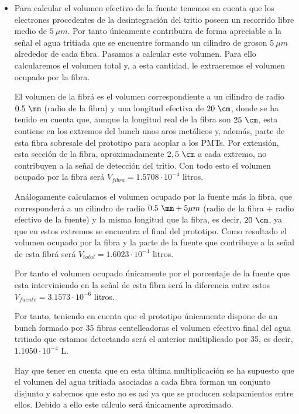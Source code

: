 \begin{itemize}
 \item{} Para calcular el volumen efectivo de la fuente tenemos en cuenta que los electrones procedentes de la desintegración del tritio poseen un recorrido libre medio de $5~\mu m$. Por tanto únicamente contribuira de forma apreciable a la señal el agua tritiada que se encuentre formando un cilindro de groson $5~\mu m$ alrededor de cada fibra. Pasamos a calcular este volumen. Para ello calcularemos el volumen total y, a esta cantidad, le extraeremos el volumen ocupado por la fibra.

El volumen de la fibrá es el volumen correspondiente a un cilindro de radio $0.5~\mm$ (radio de la fibra) y una longitud efectiva de $20~\cm$, donde se ha tenido en cuenta que, aunque la longitud real de la fibra son $25~\cm$, esta contiene en los extremos del bunch unos aros metálicos y, además, parte de esta fibra sobresale del prototipo para acoplar a los PMTs. Por extensión, esta sección de la fibra, aproximadamente $2,5~\cm$ a cada extremo,  no contribuyen a la señal de detección del tritio. Con todo esto el volumen ocupado por la fibra será $V_{fibra}=1.5708 \cdotp 10^{-4}$ litros.

Análogamente calculamos el volumen ocupado por la fuente más la fibra, que corresponderá a un cilindro de radio $0.5~\mm+5\mu m$ (radio de la fibra + radio efectivo de la fuente) y la misma longitud que la fibra, es decir, $20~\cm$, ya que en estos extremos se encuentra el final del prototipo. Como resultado el volumen ocupado por la fibra y la parte de la fuente que contribuye a la señal de esta fibrá será $V_{total}=1.6023 \cdotp 10^{-4}$ litros. 

Por tanto el volumen ocupado únicamente por el porcentaje de la fuente que esta interviniendo en la señal de esta fibra será la diferencia entre estos $V_{fuente}=3.1573 \cdotp 10^{-6}$ litros.
 
Por tanto, teniendo en cuenta que el prototipo únicamente dispone de un bunch formado por 35 fibras centelleadoras el volumen efectivo final del agua tritiado que estamos detectando será el anterior multiplicado por 35, es decir, $1.1050 \cdotp 10^{-4}$ L. 

Hay que tener en cuenta que en esta última multiplicación se ha supuesto que el volumen del agua tritiada asociadas a cada fibra forman un conjunto disjunto y sabemos que esto no es así ya que se producen solapamientos entre ellos. Debido a ello este cálculo será únicamente aproximado.


\end{itemize}

